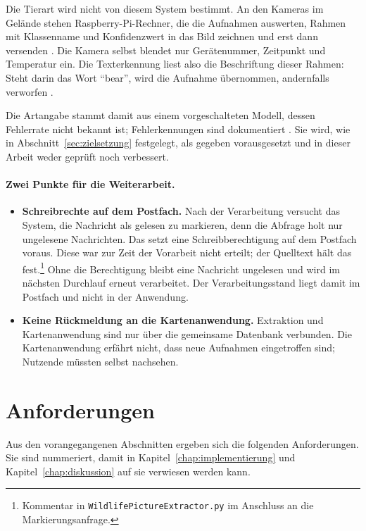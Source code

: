 \documentclass[12pt,a4paper]{report}
\begin{document}
Die Tierart wird nicht von diesem System bestimmt. An den Kameras im Gelände stehen
Raspberry-Pi-Rechner, die die Aufnahmen auswerten, Rahmen mit Klassenname und
Konfidenzwert in das Bild zeichnen und erst dann versenden \cite[S.~8]{LelchatBA}. Die
Kamera selbst blendet nur Gerätenummer, Zeitpunkt und Temperatur ein. Die Texterkennung
liest also die Beschriftung dieser Rahmen: Steht darin das Wort \enquote{bear}, wird die
Aufnahme übernommen, andernfalls verworfen \cite[S.~20]{LelchatBA}.

Die Artangabe stammt damit aus einem vorgeschalteten Modell, dessen Fehlerrate nicht bekannt
ist; Fehlerkennungen sind dokumentiert \cite[S.~24]{LelchatBA}. Sie wird, wie in
Abschnitt~\ref{sec:zielsetzung} festgelegt, als gegeben vorausgesetzt und in dieser Arbeit
weder geprüft noch verbessert.

\paragraph{Zwei Punkte für die Weiterarbeit.}

\begin{itemize}
    \item \textbf{Schreibrechte auf dem Postfach.} Nach der Verarbeitung versucht das
    System, die Nachricht als gelesen zu markieren, denn die Abfrage holt nur ungelesene
    Nachrichten. Das setzt eine Schreibberechtigung auf dem Postfach voraus. Diese war zur
    Zeit der Vorarbeit nicht erteilt; der Quelltext hält das fest.\footnote{Kommentar in
    \texttt{WildlifePictureExtractor.py} im Anschluss an die Markierungsanfrage.} Ohne die
    Berechtigung bleibt eine Nachricht ungelesen und wird im nächsten Durchlauf erneut
    verarbeitet. Der Verarbeitungsstand liegt damit im Postfach und nicht in der Anwendung.

    \item \textbf{Keine Rückmeldung an die Kartenanwendung.} Extraktion und Kartenanwendung
    sind nur über die gemeinsame Datenbank verbunden. Die Kartenanwendung erfährt nicht,
    dass neue Aufnahmen eingetroffen sind; Nutzende müssten selbst nachsehen.
\end{itemize}

\section{Anforderungen}
\label{sec:anforderungen}

Aus den vorangegangenen Abschnitten ergeben sich die folgenden Anforderungen. Sie sind
nummeriert, damit in Kapitel~\ref{chap:implementierung} und
Kapitel~\ref{chap:diskussion} auf sie verwiesen werden kann.
\end{document}
